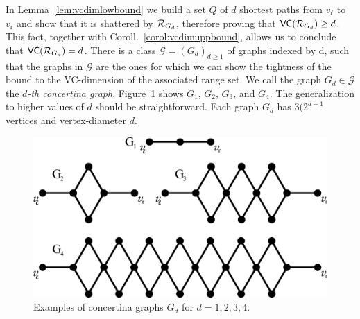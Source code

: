 In Lemma~\ref{lem:vcdimlowbound} we build a set $Q$ of $d$ shortest paths from
$v_\ell$ to $v_\mathrm{r}$ and show that it is shattered by $\mathcal{R}_{G_d}$,
therefore proving that $\mathsf{VC}(\mathcal{R}_{G_d})\ge d$. This fact, together with
Coroll.~\ref{corol:vcdimuppbound}, allows us to conclude that $\mathsf{VC}(\mathcal{R}_{G_d})=d$. 
\else
There is a class $\mathcal{G}=(G_d)_{d\ge 1}$ of graphs indexed by d, such that
the graphs in $\mathcal{G}$ are the ones for which we can show the tightness of
the bound to the VC-dimension of the associated range set. We call the graph
$G_d\in\mathcal{G}$ the \emph{$d$-th concertina graph}.
Figure~\ref{fig:tightgraphs} shows $G_1$, $G_2$, $G_3$, and $G_4$. The
generalization to higher values of $d$ should be straightforward. Each graph
$G_d$ has $3(2^{d-1}$ vertices and vertex-diameter $d$.

\fi

\begin{figure}[th]
  \centering
  \includegraphics[scale=0.3]{figures/eps/tight}
  \caption{Examples of concertina graphs $G_d$ for $d=1,2,3,4$.}
  \label{fig:tightgraphs}
\end{figure}

